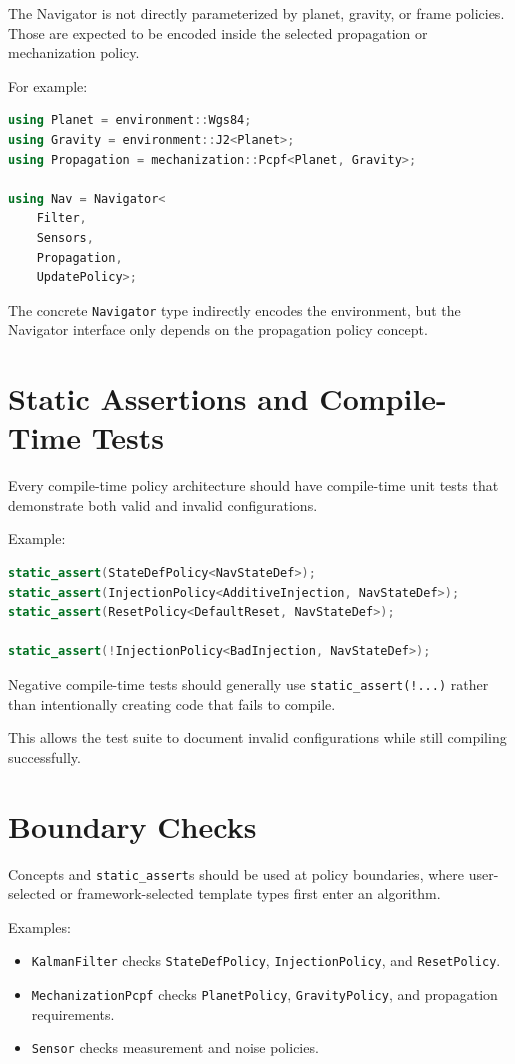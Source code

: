 \documentclass[11pt]{article}
\begin{document}
The Navigator is not directly parameterized by planet, gravity, or frame
policies. Those are expected to be encoded inside the selected propagation or
mechanization policy.

For example:

\begin{lstlisting}[language=C++]
using Planet = environment::Wgs84;
using Gravity = environment::J2<Planet>;
using Propagation = mechanization::Pcpf<Planet, Gravity>;

using Nav = Navigator<
    Filter,
    Sensors,
    Propagation,
    UpdatePolicy>;
\end{lstlisting}

The concrete \texttt{Navigator} type indirectly encodes the environment, but
the Navigator interface only depends on the propagation policy concept.

\section{Static Assertions and Compile-Time Tests}

Every compile-time policy architecture should have compile-time unit tests that
demonstrate both valid and invalid configurations.

Example:

\begin{lstlisting}[language=C++]
static_assert(StateDefPolicy<NavStateDef>);
static_assert(InjectionPolicy<AdditiveInjection, NavStateDef>);
static_assert(ResetPolicy<DefaultReset, NavStateDef>);

static_assert(!InjectionPolicy<BadInjection, NavStateDef>);
\end{lstlisting}

Negative compile-time tests should generally use \texttt{static\_assert(!...)}
rather than intentionally creating code that fails to compile.

This allows the test suite to document invalid configurations while still
compiling successfully.

\section{Boundary Checks}

Concepts and \texttt{static\_assert}s should be used at policy boundaries,
where user-selected or framework-selected template types first enter an
algorithm.

Examples:

\begin{itemize}
    \item \texttt{KalmanFilter} checks \texttt{StateDefPolicy},
    \texttt{InjectionPolicy}, and \texttt{ResetPolicy}.
    \item \texttt{MechanizationPcpf} checks \texttt{PlanetPolicy},
    \texttt{GravityPolicy}, and propagation requirements.
    \item \texttt{Sensor} checks measurement and noise policies.
\end{itemize}
\end{document}
